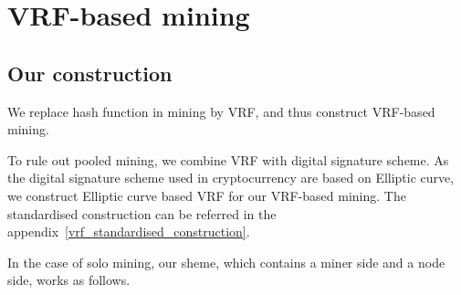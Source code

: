 \section{VRF-based mining}

\subsection{Our construction}

We replace hash function in mining by VRF, and thus construct VRF-based mining.

To rule out pooled mining, we combine VRF with digital signature scheme.
As the digital signature scheme used in cryptocurrency are based on Elliptic curve, we construct Elliptic curve based VRF for our VRF-based mining.
The standardised construction can be referred in the appendix~\ref{vrf_standardised_construction}.


In the case of solo mining, our sheme, which contains a miner side and a node side, works as follows.

